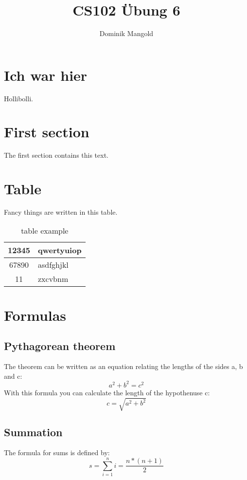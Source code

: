 \documentclass{article}
\begin{document}
\title{CS102 \"Ubung 6}
\author{Dominik Mangold}
\maketitle
\section{Ich war hier}
Hollibolli.
\section{First section}
The first section contains this text.
\section{Table}
Fancy things are written in this table.
\begin{table}[h!]
\begin{center}
\begin{tabular}{|c|l|}\hline
12345 & qwertyuiop\\\hline
67890 & asdfghjkl\\\hline
11 & zxcvbnm\\\hline
\end{tabular}
\caption{table example}
\end{center}
\end{table}
\section{Formulas}
\subsection{Pythagorean theorem}
The theorem can be written as an equation relating the lengths of the sides a, b and c:  \[ a^2 + b^2 = c^2 \]
With this formula you can calculate the length of the hypothenuse c: \[c = \sqrt{a^2 + b^2}\]
\subsection{Summation}
The formula for sums is defined by: \[s = \sum_{i = 1}^n i = \frac{n * (n + 1)}{2}\]
\end{document}

